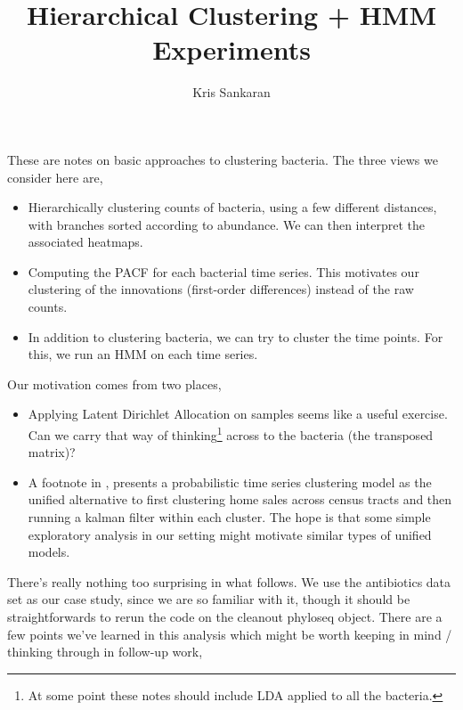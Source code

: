 \documentclass{article}
\title{Hierarchical Clustering + HMM Experiments}
\author{Kris Sankaran}
\begin{document}
\maketitle

These are notes on basic approaches to clustering bacteria. The
three views we consider here are,

\begin{itemize}
\item Hierarchically clustering counts of bacteria, using a few different
  distances, with branches sorted according to abundance. We can then interpret
  the associated heatmaps.
\item Computing the PACF for each bacterial time series. This motivates our
  clustering of the innovations (first-order differences) instead of the raw counts.
\item In addition to clustering bacteria, we can try to cluster the time points.
  For this, we run an HMM on each time series.
\end{itemize}


Our motivation comes from two places,
\begin{itemize}
  \item Applying Latent Dirichlet Allocation on samples seems like a useful
    exercise. Can we carry that way of thinking\footnote{At some point these
      notes should include LDA applied to all the bacteria.} across to the
    bacteria (the transposed matrix)?
  \item A footnote in \citep{ren2015achieving}, presents a probabilistic time
    series clustering model as the unified alternative to first clustering home
    sales across census tracts and then running a kalman filter within each
    cluster. The hope is that some simple exploratory analysis in our setting
    might motivate similar types of unified models.
\end{itemize}

There's really nothing too surprising in what follows. We use the antibiotics
data set as our case study, since we are so familiar with it, though it should
be straightforwards to rerun the code on the cleanout phyloseq object. There are
a few points we've learned in this analysis which might be worth keeping in mind
/ thinking through in follow-up work,
\end{document}
